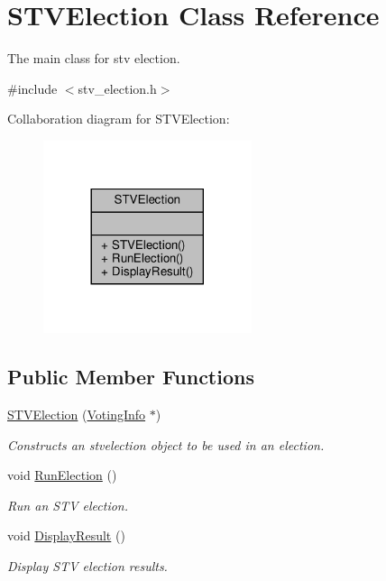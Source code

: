 \hypertarget{classSTVElection}{}\section{S\+T\+V\+Election Class Reference}
\label{classSTVElection}


The main class for stv election.  




{\ttfamily \#include $<$stv\+\_\+election.\+h$>$}



Collaboration diagram for S\+T\+V\+Election\+:\nopagebreak
\begin{figure}[H]
\begin{center}
\leavevmode
\includegraphics[width=173pt]{classSTVElection__coll__graph}
\end{center}
\end{figure}
\subsection*{Public Member Functions}
\begin{DoxyCompactItemize}
\item 
\hyperlink{classSTVElection_a6abe30e81059242a53f0c06c29331d10}{S\+T\+V\+Election} (\hyperlink{classVotingInfo}{Voting\+Info} $\ast$)
\begin{DoxyCompactList}\small\item\em Constructs an stvelection object to be used in an election. \end{DoxyCompactList}\item 
void \hyperlink{classSTVElection_a3b80c78d70ba3dc7181884b0dfcf142e}{Run\+Election} ()
\begin{DoxyCompactList}\small\item\em Run an S\+TV election. \end{DoxyCompactList}\item 
void \hyperlink{classSTVElection_a224ba2c99b4dbd2f4bbce4de8b1e98f4}{Display\+Result} ()
\begin{DoxyCompactList}\small\item\em Display S\+TV election results. \end{DoxyCompactList}\end{DoxyCompactItemize}


